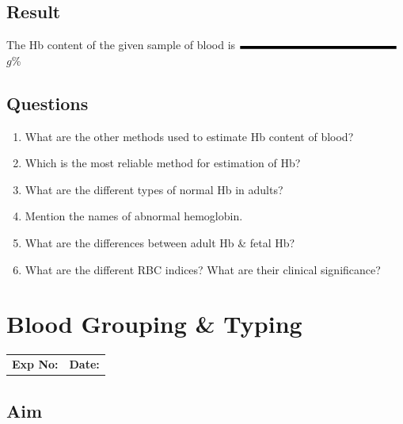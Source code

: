 \documentclass[a4paper,12pt]{book}
\begin{document}
								\section*{Result}
								The Hb content of the given sample of blood is $\rule{5cm}{0.1cm}$ $g$\%
								\section*{Questions}
								\begin{enumerate}
									\item{What are the other methods used to estimate Hb content of blood?}
									\item{Which is the most reliable method for estimation of Hb?}
									\item{What are the different types of normal Hb in adults?}
									\item{Mention the names of abnormal hemoglobin.}
									\item{What are the differences between adult Hb \& fetal Hb?}
									\item{What are the different RBC indices? What are their clinical significance?}
								\end{enumerate}

								\chapter*{\centering Blood Grouping \& Typing}
								\begin{tabular}{p{5in} p{1in}}
									\textbf{Exp No:}  & \textbf{Date:}\\
								\end{tabular}

								\section*{Aim}
\end{document}
